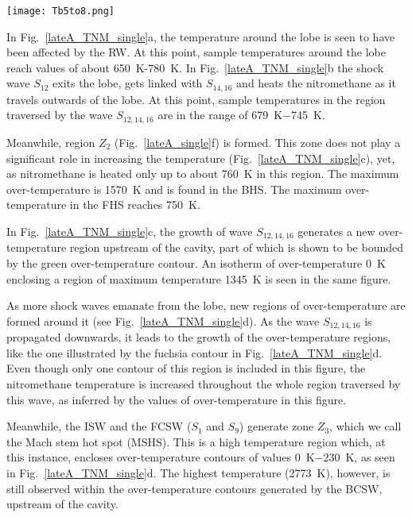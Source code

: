 \documentclass[3p,times,twocolumn]{elsarticle}
\begin{document}
\begin{figure*}
\centering
    \centering
\texttt{[image: Tb5to8.png]}
\caption{Temperature distribution of nitromethane on the central $xz$-plane
 during late stages of the collapse. The
contours represent isotherms of over-temperature. The horizontal axis
represents
$x$  and the vertical axis $z$, both  in \SI{}{\micro \meter}.}
\label{lateA_TNM_single}
\end{figure*}

In Fig.\  \ref{lateA_TNM_single}a, the temperature around the lobe is seen
to have been affected by the RW. At this point, sample temperatures around
the lobe reach values of about \SI{650}{\kelvin}-\SI{780}{\kelvin}. In Fig.\
\ref{lateA_TNM_single}b the shock wave $S_{12}$ exits the lobe, gets linked
with $S_{14,16}$ and heats the nitromethane as it travels outwards of the
lobe. At this point, sample temperatures in the region traversed by the wave
$S_{12,14,16}$ are in the range of \SI{679}{\kelvin}$-$\SI{745}{\kelvin}.

Meanwhile, region $Z_2$ (Fig.\
 \ref{lateA_single}f) is formed. This zone does  not
play a significant role in increasing the temperature (Fig.\ \ref{lateA_TNM_single}c), yet, as nitromethane is
heated only up to about \SI{760}{\kelvin} in this region. The maximum over-temperature
is \SI{1570}{\kelvin} and is found in the BHS. The maximum over-temperature
in the FHS reaches \SI{750}{\kelvin}.

In Fig.\  \ref{lateA_TNM_single}c, the growth of wave $S_{12,14,16}$ generates
a new over-temperature region upstream of the cavity, part of which is shown
to be bounded by the green over-temperature contour. An isotherm of over-temperature
\SI{0}{\kelvin} enclosing a region of maximum temperature \SI{1345}{\kelvin}
is seen in the same figure.

As more shock waves emanate from the lobe, new regions of over-temperature
are formed around it (see Fig.\  \ref{lateA_TNM_single}d). As the wave
$S_{12,14,16}$ is propagated downwards, it leads to the growth of the over-temperature
regions, like the one illustrated by the fuchsia contour in Fig.\  \ref{lateA_TNM_single}d.
Even though only one contour of this region is included in this figure, the
nitromethane temperature is increased
throughout the whole region traversed by this wave, as inferred by the values
of over-temperature in this figure. 
 
 Meanwhile, the ISW and the FCSW ($S_{1}$ and $S_{9}$) generate zone $Z_3$, which we call  the Mach stem hot spot (MSHS). This is
a high temperature region which, at this instance, encloses over-temperature
contours of values \SI{0}{\kelvin}$-$\SI{230}{\kelvin}, as seen in Fig.\
 \ref{lateA_TNM_single}d. The highest temperature (\SI{2773}{\kelvin}), however,
is still observed within the over-temperature contours generated by the BCSW,
upstream of the cavity. 
\end{document}
